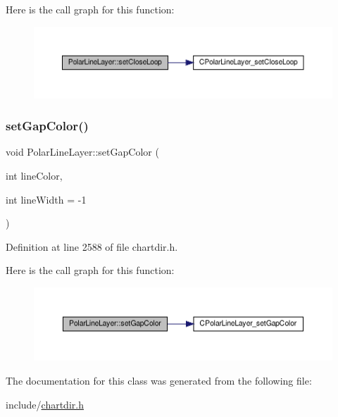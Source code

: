 Here is the call graph for this function\+:
\nopagebreak
\begin{figure}[H]
\begin{center}
\leavevmode
\includegraphics[width=350pt]{class_polar_line_layer_a2d55cd0511bd1d9f61ab9668e3feaffc_cgraph}
\end{center}
\end{figure}
\mbox{\label{class_polar_line_layer_ae432217ae01c5d8f79d2be7c4eb70c4c}} 
\subsubsection{\texorpdfstring{set\+Gap\+Color()}{setGapColor()}}
{\footnotesize\ttfamily void Polar\+Line\+Layer\+::set\+Gap\+Color (\begin{DoxyParamCaption}\item[{int}]{line\+Color,  }\item[{int}]{line\+Width = {\ttfamily -\/1} }\end{DoxyParamCaption})\hspace{0.3cm}{\ttfamily [inline]}}



Definition at line 2588 of file chartdir.\+h.

Here is the call graph for this function\+:
\nopagebreak
\begin{figure}[H]
\begin{center}
\leavevmode
\includegraphics[width=350pt]{class_polar_line_layer_ae432217ae01c5d8f79d2be7c4eb70c4c_cgraph}
\end{center}
\end{figure}


The documentation for this class was generated from the following file\+:\begin{DoxyCompactItemize}
\item 
include/\hyperlink{chartdir_8h}{chartdir.\+h}\end{DoxyCompactItemize}
